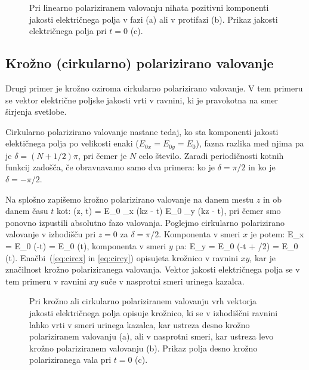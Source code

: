 \begin{figure}[ht]
\centering
\def\svgwidth{140truemm} 

\caption{Pri linearno polariziranem valovanju nihata pozitivni komponenti jakosti
električnega polja v fazi (a) ali v protifazi (b). Prikaz jakosti električnega polja
pri $t=0$ (c).}
\label{fig:03_linpol}
\end{figure}

\subsection*{Krožno (cirkularno) polarizirano valovanje}
Drugi primer je krožno oziroma cirkularno polarizirano valovanje. V tem primeru
se vektor električne poljske jakosti vrti v ravnini, ki je pravokotna na smer 
širjenja svetlobe. 

Cirkularno polarizirano valovanje nastane tedaj, ko sta komponenti jakosti 
elektičnega polja po velikosti enaki ($E_{0x} = E_{0y} = E_0$), fazna razlika 
med njima pa je $\delta = (N+1/2) \pi$, pri čemer je $N$ celo število. 
Zaradi periodičnosti kotnih funkcij zadošča, 
če obravnavamo samo dva primera: ko je $\delta = \pi/2$ in ko je 
$\delta = - \pi/2$. 

Na splošno zapišemo krožno polarizirano valovanje
na danem mestu $z$ in ob danem času $t$ kot:
\beq
{} (z, t) = E_{0} _x \cos \left(kz - \omega t\right)
\pm E_{0} _y \sin \left(kz - \omega t\right)\!\!,
\label{eq:03_40}
\eeq
pri čemer smo ponovno izpustili absolutno fazo valovanja. 
Poglejmo cirkularno polarizirano valovanje v izhodišču pri $z=0$ za 
$\delta = \pi/2$. Komponenta v smeri $x$ je potem:
\beq
E_x = E_0 \cos (-\omega t) = E_0 \cos (\omega t),
\label{eq:circx}
\eeq
komponenta v smeri $y$ pa:
\beq
E_y = E_0 \cos (-\omega t + \pi/2) = E_0 \sin (\omega t).
\label{eq:circy}
\eeq
Enačbi~(\ref{eq:circx} in \ref{eq:circy}) opisujeta krožnico v ravnini $xy$, 
kar je značilnost krožno polariziranega valovanja. Vektor jakosti
električnega polja se v tem primeru v ravnini $xy$ suče v nasprotni 
smeri urinega kazalca.
\begin{figure}[h]
\centering
\def\svgwidth{140truemm} 

\caption{Pri krožno ali cirkularno polariziranem valovanju vrh vektorja
jakosti električnega polja opisuje krožnico, ki se v izhodiščni ravnini
lahko vrti v smeri urinega kazalca, kar ustreza desno krožno polariziranem valovanju (a),
ali v nasprotni smeri, kar ustreza levo krožno polariziranem valovanju (b). 
Prikaz polja desno krožno polariziranega vala pri $t=0$ (c).}
\label{fig:03_cirkpol}
\end{figure}


